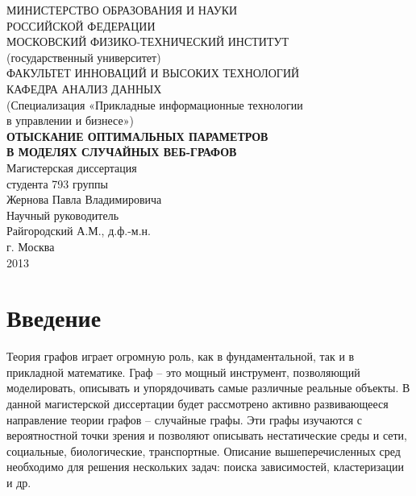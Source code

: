 \documentclass[14pt]{extreport}
\begin{document}

\begin{center}
МИНИСТЕРСТВО ОБРАЗОВАНИЯ И НАУКИ\\ РОССИЙСКОЙ ФЕДЕРАЦИИ\\[0.5cm]

МОСКОВСКИЙ ФИЗИКО-ТЕХНИЧЕСКИЙ ИНСТИТУТ\\
(государственный университет)\\[0.5cm]

ФАКУЛЬТЕТ ИННОВАЦИЙ И ВЫСОКИХ ТЕХНОЛОГИЙ\\
КАФЕДРА АНАЛИЗ ДАННЫХ\\[0.5cm]

(Специализация «Прикладные информационные технологии\\
в управлении и бизнесе»)\\[1.5cm]

{\bf ОТЫСКАНИЕ ОПТИМАЛЬНЫХ ПАРАМЕТРОВ}\\
{\bf В МОДЕЛЯХ СЛУЧАЙНЫХ ВЕБ-ГРАФОВ}\\[1.5cm]

Магистерская диссертация\\
студента 793 группы\\
Жернова Павла Владимировича\\[1.5cm]

Научный руководитель\\
Райгородский А.М., д.ф.-м.н.\\[3cm]


г. Москва\\
2013
\end{center}
\newpage
{} 
\setcounter{page}{2}
\tableofcontents
\newpage

\chapter{Введение}

Теория графов играет огромную роль, как в фундаментальной, так и в прикладной математике. Граф -- это мощный инструмент, позволяющий моделировать, описывать и упорядочивать самые различные реальные объекты. В данной магистерской диссертации будет рассмотрено активно развивающееся направление теории графов -- случайные графы.  Эти графы изучаются с вероятностной точки зрения и позволяют описывать нестатические среды и сети, социальные, биологические, транспортные. Описание вышеперечисленных сред необходимо для решения нескольких задач: поиска зависимостей, кластеризации и др.
\end{document}
